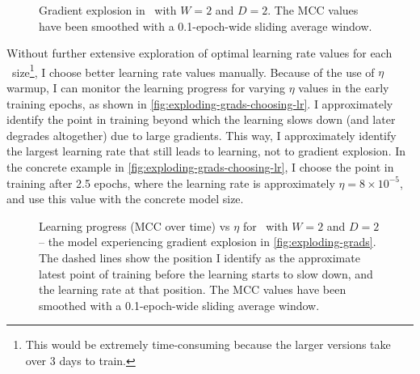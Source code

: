 {{{      \begin{figure}[h!t]
        \centering
        \caption{Gradient explosion in \BERTS~with $W=2$ and $D=2$. The MCC values have been smoothed with a 0.1-epoch-wide sliding average window.}
        \label{fig:exploding-grads}
      \end{figure}

      Without further extensive exploration of optimal learning rate values for each \BERTS~size\footnote{This would be extremely time-consuming because the larger versions take over 3 days to train.}, I choose better learning rate values manually.
      Because of the use of $\eta$ warmup, I can monitor the learning progress for varying $\eta$ values in the early training epochs, as shown in \autoref{fig:exploding-grads-choosing-lr}. I approximately identify the point in training beyond which the learning slows down (and later degrades altogether) due to large gradients. This way, I approximately identify the largest learning rate that still leads to learning, not to gradient explosion. In the concrete example in \autoref{fig:exploding-grads-choosing-lr}, I choose the point in training after 2.5 epochs, where the learning rate is approximately $\eta=8\times10^{-5}$, and use this value with the concrete model size.
      
      \begin{figure}[h!t]
        \centering
        \caption{Learning progress (MCC over time) vs $\eta$ for \BERTS~with $W=2$ and $D=2$ -- the model experiencing gradient explosion in \autoref{fig:exploding-grads}. The dashed lines show the position I identify as the approximate latest point of training before the learning starts to slow down, and the learning rate at that position.
        The MCC values have been smoothed with a 0.1-epoch-wide sliding average window.}
        \label{fig:exploding-grads-choosing-lr}
      \end{figure}

}}}
